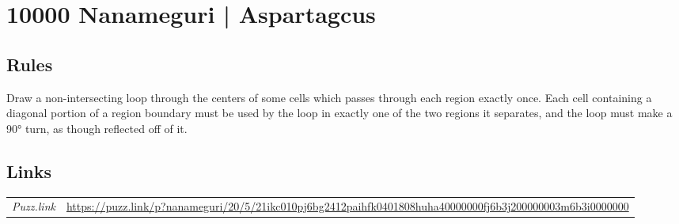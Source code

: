 \section{10000 Nanameguri | {\normalfont Aspartagcus}}
\label{sec:35-10000-nanameguri-aspartagcus}

\subsection*{Rules}
\begin{markdown}
Draw a non-intersecting loop through the centers of some cells which passes through each region exactly once. Each cell containing a diagonal portion of a region boundary must be used by the loop in exactly one of the two regions it separates, and the loop must make a 90° turn, as though reflected off of it.
\end{markdown}
\subsection*{Links}
\begin{tabularx}{\textwidth}{l X}
\emph{Puzz.link} & \url{https://puzz.link/p?nanameguri/20/5/21ikc010pj6bg2412paihfk0401808huha40000000fj6b3j200000003m6b3i0000000} \\
\end{tabularx}
\pagebreak
